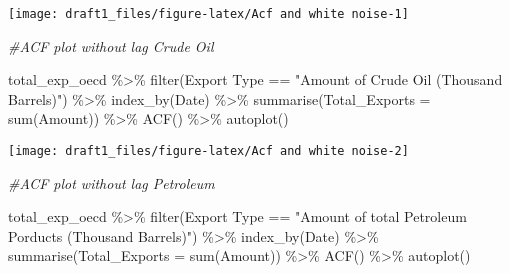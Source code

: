 \documentclass[
]{article}
\newenvironment{Shaded}{\begin{snugshade}}{\end{snugshade}}
\newcommand{\AttributeTok}[1]{\textcolor[rgb]{0.77,0.63,0.00}{#1}}
\newcommand{\CommentTok}[1]{\textcolor[rgb]{0.56,0.35,0.01}{\textit{#1}}}
\newcommand{\FunctionTok}[1]{\textcolor[rgb]{0.00,0.00,0.00}{#1}}
\newcommand{\NormalTok}[1]{#1}
\newcommand{\SpecialCharTok}[1]{\textcolor[rgb]{0.00,0.00,0.00}{#1}}
\newcommand{\StringTok}[1]{\textcolor[rgb]{0.31,0.60,0.02}{#1}}
\begin{document}
\begin{center}\texttt{[image: draft1\_files/figure-latex/Acf and white noise-1]} \end{center}

\begin{Shaded}
\begin{Highlighting}[]
\CommentTok{\#ACF plot without lag Crude Oil}

\NormalTok{total\_exp\_oecd }\SpecialCharTok{\%\textgreater{}\%} \FunctionTok{filter}\NormalTok{(}\StringTok{\textasciigrave{}}\AttributeTok{Export Type}\StringTok{\textasciigrave{}} \SpecialCharTok{==} \StringTok{"Amount of Crude Oil (Thousand Barrels)"}\NormalTok{) }\SpecialCharTok{\%\textgreater{}\%} 
  \FunctionTok{index\_by}\NormalTok{(Date) }\SpecialCharTok{\%\textgreater{}\%} 
  \FunctionTok{summarise}\NormalTok{(}\AttributeTok{Total\_Exports =} \FunctionTok{sum}\NormalTok{(}\StringTok{\textasciigrave{}}\AttributeTok{Amount}\StringTok{\textasciigrave{}}\NormalTok{)) }\SpecialCharTok{\%\textgreater{}\%} 
  \FunctionTok{ACF}\NormalTok{() }\SpecialCharTok{\%\textgreater{}\%}  \FunctionTok{autoplot}\NormalTok{()}
\end{Highlighting}
\end{Shaded}

\begin{center}\texttt{[image: draft1\_files/figure-latex/Acf and white noise-2]} \end{center}

\begin{Shaded}
\begin{Highlighting}[]
\CommentTok{\#ACF plot without lag Petroleum}

\NormalTok{total\_exp\_oecd }\SpecialCharTok{\%\textgreater{}\%} \FunctionTok{filter}\NormalTok{(}\StringTok{\textasciigrave{}}\AttributeTok{Export Type}\StringTok{\textasciigrave{}} \SpecialCharTok{==} \StringTok{"Amount of total Petroleum Porducts (Thousand Barrels)"}\NormalTok{) }\SpecialCharTok{\%\textgreater{}\%} 
  \FunctionTok{index\_by}\NormalTok{(Date) }\SpecialCharTok{\%\textgreater{}\%} 
  \FunctionTok{summarise}\NormalTok{(}\AttributeTok{Total\_Exports =} \FunctionTok{sum}\NormalTok{(}\StringTok{\textasciigrave{}}\AttributeTok{Amount}\StringTok{\textasciigrave{}}\NormalTok{)) }\SpecialCharTok{\%\textgreater{}\%} 
  \FunctionTok{ACF}\NormalTok{() }\SpecialCharTok{\%\textgreater{}\%}  \FunctionTok{autoplot}\NormalTok{()}
\end{Highlighting}
\end{Shaded}
\end{document}
